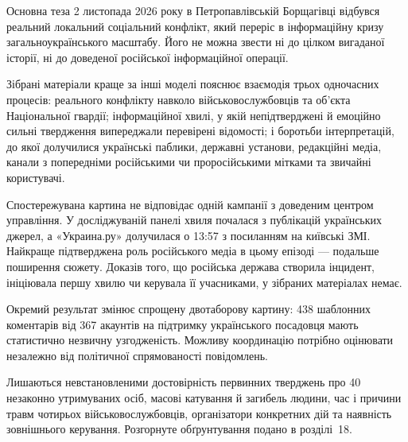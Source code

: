 \begin{keybox}{Основна теза}
2 листопада 2026 року в Петропавлівській Борщагівці відбувся реальний локальний соціальний конфлікт, який переріс в інформаційну кризу загальноукраїнського масштабу. Його не можна звести ні до цілком вигаданої історії, ні до доведеної російської інформаційної операції.
\end{keybox}

Зібрані матеріали краще за інші моделі пояснює взаємодія трьох одночасних процесів: реального конфлікту навколо військовослужбовців та об'єкта Національної гвардії; інформаційної хвилі, у якій непідтверджені й емоційно сильні твердження випереджали перевірені відомості; і боротьби інтерпретацій, до якої долучилися українські паблики, державні установи, редакційні медіа, канали з попередніми російськими чи проросійськими мітками та звичайні користувачі.

Спостережувана картина не відповідає одній кампанії з доведеним центром управління. У досліджуваній панелі хвиля почалася з публікацій українських джерел, а «Украина.ру» долучилася о 13:57 з посиланням на київські ЗМІ. Найкраще підтверджена роль російського медіа в цьому епізоді --- подальше поширення сюжету. Доказів того, що російська держава створила інцидент, ініціювала першу хвилю чи керувала її учасниками, у зібраних матеріалах немає.

Окремий результат змінює спрощену двотаборову картину: 438 шаблонних коментарів від 367 акаунтів на підтримку українського посадовця мають статистично незвичну узгодженість. Можливу координацію потрібно оцінювати незалежно від політичної спрямованості повідомлень.

Лишаються невстановленими достовірність первинних тверджень про 40 незаконно утримуваних осіб, масові катування й загибель людини, час і причини травм чотирьох військовослужбовців, організатори конкретних дій та наявність зовнішнього керування. Розгорнуте обґрунтування подано в розділі~18.
